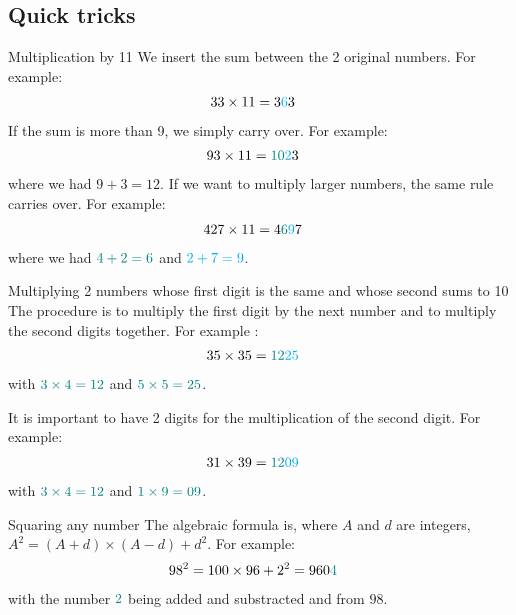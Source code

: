 \documentclass[10pt, french]{article}
\begin{document}
\begin{multicols*}{3} 
\section*{Quick tricks}
\begin{CHPT_SUMM}{Multiplication by 11}
We insert the sum between the 2 original numbers.
For example:
	\begin{align*}
		33 \times 11	
		&=	3 \textcolor{cyan}{6}3
	\end{align*}
If the sum is more than 9, we simply carry over. 
For example:
	\begin{align*}
		93 \times 11	
		&=	\textcolor{teal}{10} \textcolor{cyan}{2} 3
	\end{align*}
where we had $9 + 3 = 12$.
If we want to multiply larger numbers, the same rule carries over.
For example:
	\begin{align*}
		427 \times 11
		&=	4 \textcolor{teal}{6} \textcolor{cyan}{9}7
	\end{align*}
where we had $\textcolor{teal}{4 + 2 = 6}$ and $\textcolor{cyan}{2 + 7 = 9}$.
\end{CHPT_SUMM}

\begin{CHPT_SUMM}{Multiplying 2 numbers whose first digit is the same and whose second sums to 10}
The procedure is to multiply the first digit by the next number and to multiply the second digits together.
For example :
	\begin{align*}
	35 \times 35
	&=	\textcolor{teal}{12}\textcolor{cyan}{25}
	\end{align*}
with $\textcolor{teal}{3 \times 4 = 12}$ and $\textcolor{teal}{5 \times 5 = 25}$.

It is important to have 2 digits for the multiplication of the second digit. 
For example:
	\begin{align*}
	31 \times 39
	&=	\textcolor{teal}{12}\textcolor{cyan}{09}
	\end{align*}
with $\textcolor{teal}{3 \times 4 = 12}$ and $\textcolor{teal}{1 \times 9 = 09}$.
\end{CHPT_SUMM}

\begin{CHPT_SUMM}{Squaring any number}
The algebraic formula is, where $A$ and $d$ are integers, $A^{2} = (A + d) \times (A - d) + d^{2}$.
For example:
	\begin{align*}
	98^{2}	
	&=	100 \times 96 + 2^{2}
	=	960\textcolor{teal}{4}
	\end{align*}
with the number $\textcolor{teal}{2}$ being added and substracted and from $98$.


\end{CHPT_SUMM}
\end{multicols*}
\end{document}
